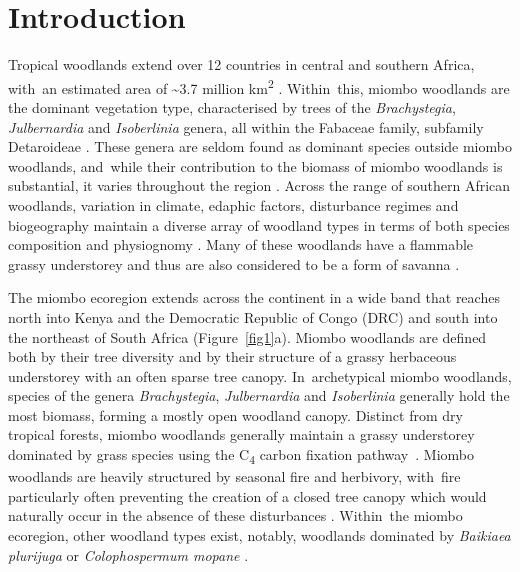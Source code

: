 \documentclass[diversity,article,accept,moreauthors,pdftex]{Definitions/mdpi}
\begin{document}

\section{Introduction}

Tropical woodlands extend over 12 countries in central and southern Africa, with~an estimated area of \textasciitilde{}3.7 million km\textsuperscript{2} \citep{White1983, Mayaux2004, Arino2010}. Within~this, miombo woodlands are the dominant vegetation type, characterised by trees of the \textit{Brachystegia}, \textit{Julbernardia} and \textit{Isoberlinia} genera, all within the Fabaceae family, subfamily Detaroideae \citep{Chidumayo1997, Campbell2002, Azani2017}. These genera are seldom found as dominant species outside miombo woodlands, and~while their contribution to the biomass of miombo woodlands is substantial, it varies throughout the region \citep{Campbell2002}. Across the range of southern African woodlands, variation in climate, edaphic factors, disturbance regimes and biogeography maintain a diverse array of woodland types in terms of both species composition and physiognomy \citep{Privette2004, Caylor2004, Chidumayo2002}. Many of these woodlands have a flammable grassy understorey and thus are also considered to be a form of savanna \citep{Ratnam2011}.

The miombo ecoregion extends across the continent in a wide band that reaches north into Kenya and the Democratic Republic of Congo (DRC) and south into the northeast of South Africa (Figure~\ref{fig1}a). Miombo woodlands are defined both by their tree diversity and by their structure of a grassy herbaceous understorey with an often sparse tree canopy. In~archetypical miombo woodlands, species of the genera \textit{Brachystegia}, \textit{Julbernardia} and \textit{Isoberlinia} generally hold the most biomass, forming a mostly open woodland canopy. Distinct from dry tropical forests, miombo woodlands generally maintain a grassy understorey dominated by grass species using the C\textsubscript{4} carbon fixation pathway~\citep{Dexter2015}. Miombo woodlands are heavily structured by seasonal fire and herbivory, with~fire particularly often preventing the creation of a closed tree canopy which would naturally occur in the absence of these disturbances \citep{Oliveras2016, Dantas2016}. Within~the miombo ecoregion, other woodland types exist, notably, woodlands dominated by \textit{Baikiaea plurijuga} or \textit{Colophospermum mopane} \citep{Campbell2002}.
\end{document}
